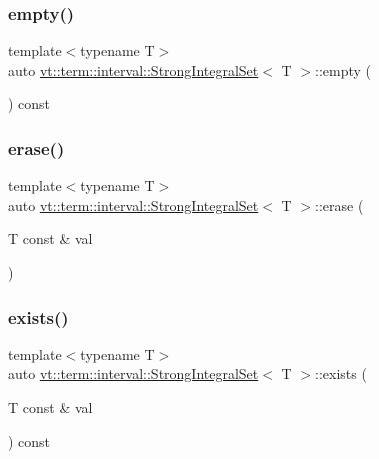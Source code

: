 \subsubsection{\texorpdfstring{empty()}{empty()}}
{\footnotesize\ttfamily template$<$typename T$>$ \\
auto \hyperlink{structvt_1_1term_1_1interval_1_1_strong_integral_set}{vt\+::term\+::interval\+::\+Strong\+Integral\+Set}$<$ T $>$\+::empty (\begin{DoxyParamCaption}{ }\end{DoxyParamCaption}) const\hspace{0.3cm}{\ttfamily [inline]}}

\mbox{\label{structvt_1_1term_1_1interval_1_1_strong_integral_set_aabff90c89e73f60251264b5776fe175e}} 
\subsubsection{\texorpdfstring{erase()}{erase()}}
{\footnotesize\ttfamily template$<$typename T$>$ \\
auto \hyperlink{structvt_1_1term_1_1interval_1_1_strong_integral_set}{vt\+::term\+::interval\+::\+Strong\+Integral\+Set}$<$ T $>$\+::erase (\begin{DoxyParamCaption}\item[{T const \&}]{val }\end{DoxyParamCaption})\hspace{0.3cm}{\ttfamily [inline]}}

\mbox{\label{structvt_1_1term_1_1interval_1_1_strong_integral_set_a4dc2dd8090dda60cc1e14ee2771786d1}} 
\subsubsection{\texorpdfstring{exists()}{exists()}}
{\footnotesize\ttfamily template$<$typename T$>$ \\
auto \hyperlink{structvt_1_1term_1_1interval_1_1_strong_integral_set}{vt\+::term\+::interval\+::\+Strong\+Integral\+Set}$<$ T $>$\+::exists (\begin{DoxyParamCaption}\item[{T const \&}]{val }\end{DoxyParamCaption}) const\hspace{0.3cm}{\ttfamily [inline]}}

